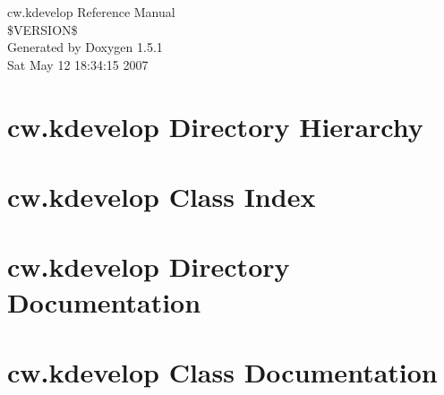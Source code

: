 \documentclass[a4paper]{book}
\begin{document}
\begin{titlepage}
\vspace*{7cm}
\begin{center}
{\Large cw.kdevelop Reference Manual\\[1ex]\large \$VERSION\$ }\\
\vspace*{1cm}
{\large Generated by Doxygen 1.5.1}\\
\vspace*{0.5cm}
{\small Sat May 12 18:34:15 2007}\\
\end{center}
\end{titlepage}
\clearemptydoublepage
{}
\tableofcontents
\clearemptydoublepage
{}
\chapter{cw.kdevelop Directory Hierarchy}

\chapter{cw.kdevelop Class Index}

\chapter{cw.kdevelop Directory Documentation}







\chapter{cw.kdevelop Class Documentation}







\printindex
\end{document}
